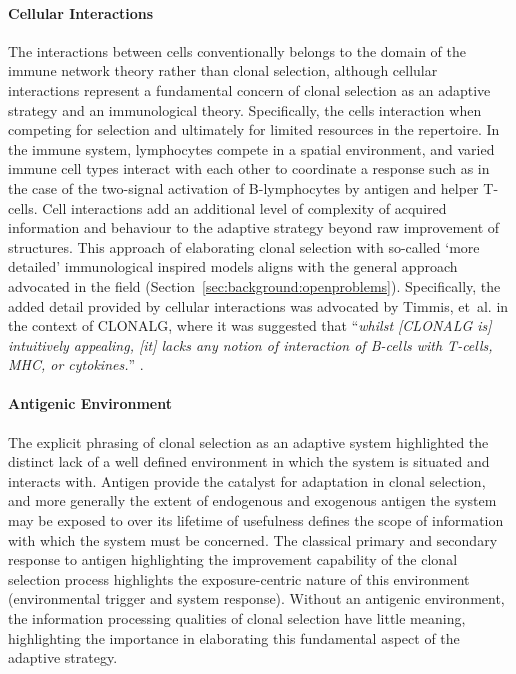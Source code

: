 \paragraph{Cellular Interactions}
The interactions between cells conventionally belongs to the domain of the immune network theory rather than clonal selection, although cellular interactions represent a fundamental concern of clonal selection as an adaptive strategy and an immunological theory. Specifically, the cells interaction when competing for selection and ultimately for limited resources in the repertoire. In the immune system, lymphocytes compete in a spatial environment, and varied immune cell types interact with each other to coordinate a response such as in the case of the two-signal activation of B-lymphocytes by antigen and helper T-cells. Cell interactions add an additional level of complexity of acquired information and behaviour to the adaptive strategy beyond raw improvement of structures. This approach of elaborating clonal selection with so-called `more detailed' immunological inspired models aligns with the general approach advocated in the field (Section~\ref{sec:background:openproblems}). Specifically, the added detail provided by cellular interactions was advocated by Timmis, et~al. in the context of CLONALG, where it was suggested that ``\emph{whilst [CLONALG is] intuitively appealing, [it] lacks any notion of interaction of B-cells with T-cells, MHC, or cytokines.}'' \cite{Timmis2005}.

%
%
\paragraph{Antigenic Environment}
The explicit phrasing of clonal selection as an adaptive system highlighted the distinct lack of a well defined environment in which the system is situated and interacts with. Antigen provide the catalyst for adaptation in clonal selection, and more generally the extent of endogenous and exogenous antigen the system may be exposed to over its lifetime of usefulness defines the scope of information with which the system must be concerned.	The classical primary and secondary response to antigen highlighting the improvement capability of the clonal selection process highlights the exposure-centric nature of this environment (environmental trigger and system response). Without an antigenic environment, the information processing qualities of clonal selection have little meaning, highlighting the importance in elaborating this fundamental aspect of the adaptive strategy.	


